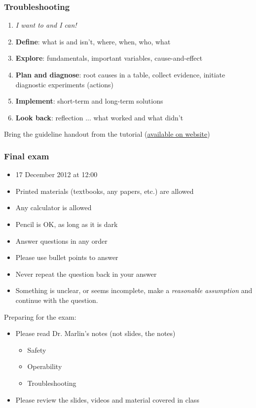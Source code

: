 \begin{frame}\frametitle{Troubleshooting}
	\begin{enumerate}
		\item	\emph{I want to and I can!}
		\item	\textbf{Define}: what is and isn't, where, when, who, what
		\item	\textbf{Explore}: fundamentals, important variables, cause-and-effect
		\item	\textbf{Plan and diagnose}: root causes in a table, collect evidence, initiate diagnostic experiments (actions)
		\item	\textbf{Implement}: short-term and long-term solutions
		\item	\textbf{Look back}: reflection ... what worked and what didn't
	\end{enumerate}
	\vspace{12pt}
	Bring the guideline handout from the tutorial (\href{http://learnche.mcmaster.ca/4N4/Process_troubleshooting_-_2012}{available on website})
\end{frame}

\begin{frame}\frametitle{Final exam}
	\begin{itemize}
		\item	17 December 2012 at 12:00
		\item	Printed materials (textbooks, any papers, etc.) are allowed
		\item	Any calculator is allowed
		\item	Pencil is OK, as long as it is dark
		\item	Answer questions in any order
		\item	Please use bullet points to answer
		\item	Never repeat the question back in your answer
		\item	Something is unclear, or seems incomplete, make a \emph{reasonable assumption} and continue with the question.
	\end{itemize}
	\vspace{12pt}
	Preparing for the exam:
	\begin{itemize}
		\item	Please read Dr. Marlin's notes (not slides, the notes)
		\begin{itemize}
			\item	Safety
			\item	Operability
			\item	Troubleshooting
		\end{itemize}
		\item	Please review the slides, videos and material covered in class
	\end{itemize}
\end{frame}

